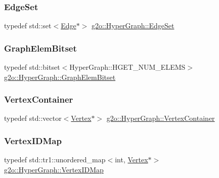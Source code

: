 \subsubsection{\texorpdfstring{Edge\+Set}{EdgeSet}}
{\footnotesize\ttfamily typedef std\+::set$<$\mbox{\hyperlink{classg2o_1_1_hyper_graph_1_1_edge}{Edge}}$\ast$$>$ \mbox{\hyperlink{classg2o_1_1_hyper_graph_a5e2970e236c0dcb4eff7c205d7b6b4ae}{g2o\+::\+Hyper\+Graph\+::\+Edge\+Set}}}

\mbox{\label{classg2o_1_1_hyper_graph_a7b8fda20e1b03e92aeceeac6e8218b73}} 
\subsubsection{\texorpdfstring{Graph\+Elem\+Bitset}{GraphElemBitset}}
{\footnotesize\ttfamily typedef std\+::bitset$<$Hyper\+Graph\+::\+H\+G\+E\+T\+\_\+\+N\+U\+M\+\_\+\+E\+L\+E\+MS$>$ \mbox{\hyperlink{classg2o_1_1_hyper_graph_a7b8fda20e1b03e92aeceeac6e8218b73}{g2o\+::\+Hyper\+Graph\+::\+Graph\+Elem\+Bitset}}}

\mbox{\label{classg2o_1_1_hyper_graph_a9339534c99300a0ddac87ba976ef188c}} 
\subsubsection{\texorpdfstring{Vertex\+Container}{VertexContainer}}
{\footnotesize\ttfamily typedef std\+::vector$<$\mbox{\hyperlink{classg2o_1_1_hyper_graph_1_1_vertex}{Vertex}}$\ast$$>$ \mbox{\hyperlink{classg2o_1_1_hyper_graph_a9339534c99300a0ddac87ba976ef188c}{g2o\+::\+Hyper\+Graph\+::\+Vertex\+Container}}}

\mbox{\label{classg2o_1_1_hyper_graph_a97307eac064ebf4b3e2cfbf0718035b5}} 
\subsubsection{\texorpdfstring{Vertex\+I\+D\+Map}{VertexIDMap}}
{\footnotesize\ttfamily typedef std\+::tr1\+::unordered\+\_\+map$<$int, \mbox{\hyperlink{classg2o_1_1_hyper_graph_1_1_vertex}{Vertex}}$\ast$$>$ \mbox{\hyperlink{classg2o_1_1_hyper_graph_a97307eac064ebf4b3e2cfbf0718035b5}{g2o\+::\+Hyper\+Graph\+::\+Vertex\+I\+D\+Map}}}

